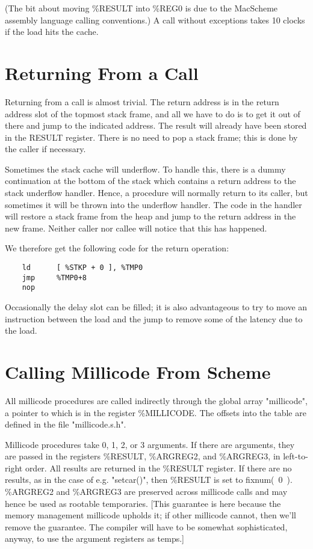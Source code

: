 (The bit about moving \%RESULT into \%REG0 is due to the MacScheme assembly
language calling conventions.) A call without exceptions takes 10 clocks if
the load hits the cache.

\section{Returning From a Call}

Returning from a call is almost trivial. The return address is in the
return address slot of the topmost stack frame, and all we have to do
is to get it out of there and jump to the indicated address. The result
will already have been stored in the RESULT register. There is no need
to pop a stack frame; this is done by the caller if necessary.

Sometimes the stack cache will underflow. To handle this, there is a dummy
continuation at the bottom of the stack which contains a return address to
the stack underflow handler. Hence, a procedure will normally return to its
caller, but sometimes it will be thrown into the underflow handler. The code
in the handler will restore a stack frame from the heap and jump to the
return address in the new frame. Neither caller nor callee will notice that
this has happened.

We therefore get the following code for the return operation:

\begin{minipage}{\linewidth}
\begin{verbatim}
    ld      [ %STKP + 0 ], %TMP0
    jmp     %TMP0+8
    nop
\end{verbatim}
\end{minipage}

Occasionally the delay slot can be filled; it is also advantageous to
try to move an instruction between the load and the jump to remove some
of the latency due to the load.

\section{Calling Millicode From Scheme}

All millicode procedures are called indirectly through the global
array "millicode", a pointer to which is in the register \%MILLICODE.
The offsets into the table are defined in the file "millicode.s.h".

Millicode procedures take 0, 1, 2, or 3 arguments. If there are
arguments, they are passed in the registers \%RESULT, \%ARGREG2, and
\%ARGREG3, in left-to-right order. All results are returned in the
\%RESULT register.  If there are no results, as in the case of e.g.
"setcar()", then \%RESULT is set to fixnum(~0~). \%ARGREG2 and \%ARGREG3 are
preserved across millicode calls and may hence be used as rootable
temporaries. [This guarantee is here because the memory management
millicode upholds it; if other millicode cannot, then we'll remove the
guarantee. The compiler will have to be somewhat sophisticated,
anyway, to use the argument registers as temps.]

